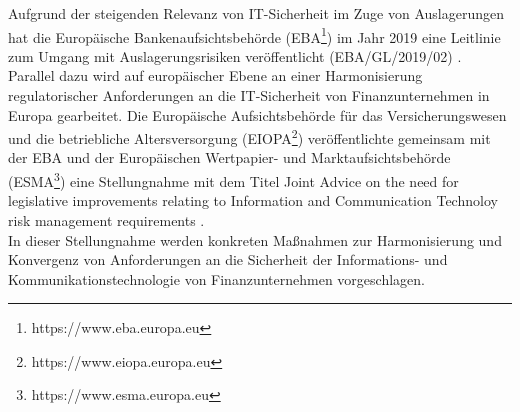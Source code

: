 \bigbreak
Aufgrund der steigenden Relevanz von IT-Sicherheit im Zuge von Auslagerungen hat die \glqq{}Europäische Bankenaufsichtsbehörde\grqq{} (EBA\footnote{https://www.eba.europa.eu}) im Jahr 2019 eine Leitlinie zum Umgang mit Auslagerungsrisiken veröffentlicht (EBA/GL/2019/02) \autocite{eba_leitlinien_konvergenzkriterien}. Parallel dazu wird auf europäischer Ebene an einer Harmonisierung regulatorischer Anforderungen an die IT-Sicherheit von Finanzunternehmen in Europa gearbeitet. Die \glqq{}Europäische Aufsichtsbehörde für das Versicherungswesen und die betriebliche Altersversorgung\grqq{} (EIOPA\footnote{https://www.eiopa.europa.eu}) veröffentlichte gemeinsam mit der EBA und der \glqq{}Europäischen Wertpapier- und Marktaufsichtsbehörde\grqq{} (ESMA\footnote{https://www.esma.europa.eu}) eine Stellungnahme mit dem Titel \glqq{}Joint Advice on the need for legislative improvements relating to Information and Communication Technoloy risk management requirements\grqq{} \autocite{european_banking_authority_2019}. \\
In dieser Stellungnahme werden konkreten Maßnahmen zur Harmonisierung und Konvergenz von Anforderungen an die Sicherheit der Informations- und Kommunikationstechnologie von Finanzunternehmen vorgeschlagen. \autocite{Bafin2019} 

